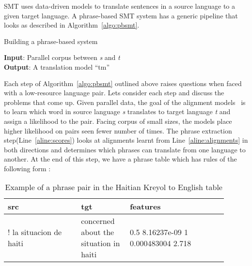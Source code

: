 SMT uses data-driven models to translate sentences in a source language to a given target language. A phrase-based SMT system has a generic pipeline that looks as described in Algorithm~\ref{algo:pbsmt}. 

\begin{algorithm}
\small
\caption{Building a phrase-based system}
\label{algo:pbsmt}
\textbf{Input}: Parallel corpus between \emph{s} and \emph{t} \\
\textbf{Output}: A translation model ``tm'' 
\begin{algorithmic}[l]
	 \label{aline:alignments}
	 \label{aline:scores}
	 \label{aline:MERT}
\end{algorithmic}
\end{algorithm}

Each step of Algorithm~\ref{algo:pbsmt} outlined above raises questions when faced with a low-resource language pair. Lets consider each step and discuss the problems that come up. Given parallel data, the goal of the alignment models~\cite{Brown:1993,Vogel:1996} is to learn which word in source language \emph{s} translates to target language \emph{t} and assign a likelihood to the pair. Facing corpus of small sizes, the models place higher likelihood on pairs seen fewer number of times. The phrase extraction step(Line~\ref{aline:scores}) looks at alignments learnt from Line~\ref{aline:alignments} in both directions and determines which phrases can translate from one language to another. At the end of this step, we have a phrase table which has rules of the following form : 

\begin{table*}
\small
\small
\centering
\begin{tabular}{p{0.3\linewidth}p{0.2\linewidth}p{0.4\linewidth}}
\toprule
src & tgt & features \\
\toprule
! la situacion de haiti & concerned about the situation in haiti & 0.5 8.16237e-09 1 0.000483004 2.718 \\
\bottomrule
\end{tabular}
\caption{Example of a phrase pair in the Haitian Kreyol to English table}
\label{table:example_rule}
\end{table*}

